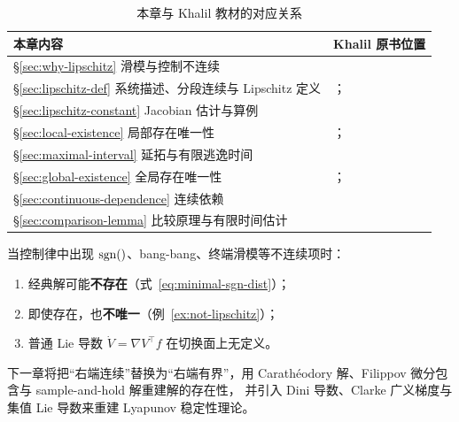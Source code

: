 \begin{table}[!htb]
  \centering
  \small
  \begin{tabular}{p{5.6cm}|p{6.4cm}}
    \hline
    本章内容 & Khalil 原书位置 \\
    \hline
    \S\ref{sec:why-lipschitz} 滑模与控制不连续 & \cite[§14.1.2]{khalilNonlinearSystems} \\
    \S\ref{sec:lipschitz-def} 系统描述、分段连续与 Lipschitz 定义 & \cite[§1.1]{khalilNonlinearControl2015}；\cite[§3.1]{khalilNonlinearSystems} \\
    \S\ref{sec:lipschitz-constant} Jacobian 估计与算例 & \cite[Lemma 3.1--3.3, Example 3.1--3.2]{khalilNonlinearSystems} \\
    \S\ref{sec:local-existence} 局部存在唯一性 & \cite[Theorem 3.1, Appendix C.1]{khalilNonlinearSystems}；\cite[Lemma 1.1]{khalilNonlinearControl2015} \\
    \S\ref{sec:maximal-interval} 延拓与有限逃逸时间 & \cite[§3.1, Example 3.3]{khalilNonlinearSystems} \\
    \S\ref{sec:global-existence} 全局存在唯一性 & \cite[Theorem 3.2--3.3]{khalilNonlinearSystems}；\cite[Lemma 1.2--1.3]{khalilNonlinearControl2015} \\
    \S\ref{sec:continuous-dependence} 连续依赖 & \cite[Theorem 3.4--3.5]{khalilNonlinearSystems} \\
    \S\ref{sec:comparison-lemma} 比较原理与有限时间估计 & \cite[Lemma 3.4, Example 3.8]{khalilNonlinearSystems} \\
    \hline
  \end{tabular}
  \caption{本章与 Khalil 教材的对应关系}
  \label{tab:khalil-map}
\end{table}

当控制律中出现 $\sgn$、bang-bang、终端滑模等不连续项时：
\begin{enumerate}
  \item 经典解可能\textbf{不存在}（式~\eqref{eq:minimal-sgn-dist}）；
  \item 即使存在，也\textbf{不唯一}（例~\ref{ex:not-lipschitz}）；
  \item 普通 Lie 导数 $\dot V=\nabla V^\top f$ 在切换面上无定义。
\end{enumerate}
下一章将把“右端连续”替换为“右端有界”，用 Carathéodory 解、Filippov 微分包含与 sample-and-hold 解重建解的存在性，
并引入 Dini 导数、Clarke 广义梯度与集值 Lie 导数来重建 Lyapunov 稳定性理论。
